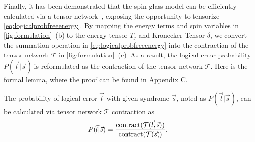 Finally, it has been demonstrated that the spin glass model can be efficiently calculated via a tensor network~\cite{cao2025exact}, exposing the opportunity to tensorize \eqref{eq:logicalprobfreeenergy}. By mapping the energy terms and spin variables in \autoref{fig:formulation}~(b) to the energy tensor $T_j$ and Kronecker Tensor $\delta$, we convert the summation operation in \eqref{eq:logicalprobfreeenergy} into the contraction of the tensor network $\mathcal{T}$ in \autoref{fig:formulation}~(c). As a result, the logical error probability $P(\vec{l}|\vec{s})$ is reformulated as the contraction of the tensor network $\mathcal{T}$. Here is the formal lemma, where the proof can be found in \hyperref[subsec:proofC]{Appendix C}.
\begin{lemma}\label{theorem:decodingTensor}
    The probability of logical error $\vec{l}$ with given syndrome $\vec{s}$, noted as $P(\vec{l}|\vec{s})$, can be calculated via tensor network $\mathcal{T}$ contraction as
    \begin{equation}\small
    P(\vec{l}|\vec{s}) = 
    \frac{{\text{contract}}(\mathcal{T}(\vec{l},\vec{s}))}{\text{contract}(\mathcal{T}(\vec{s}))}. 
    \end{equation}
\end{lemma}



